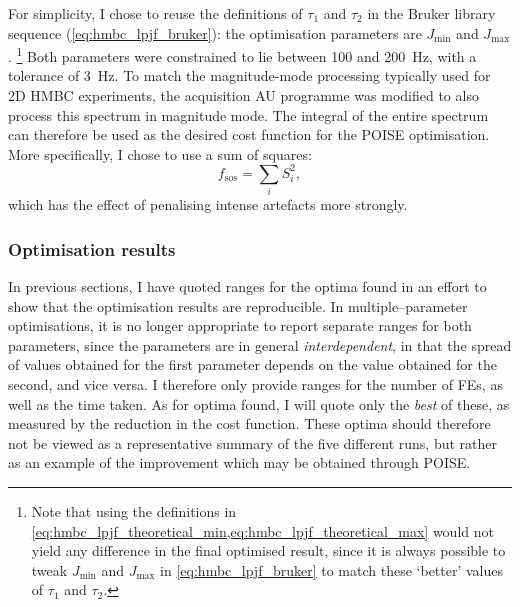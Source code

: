For simplicity, I chose to reuse the definitions of $\tau_1$ and $\tau_2$ in the Bruker library sequence (\cref{eq:hmbc_lpjf_bruker}): the optimisation parameters are $J_\text{min}$ and $J_\text{max}$.%
\footnote{Note that using the definitions in \cref{eq:hmbc_lpjf_theoretical_min,eq:hmbc_lpjf_theoretical_max} would not yield any difference in the final optimised result, since it is always possible to tweak $J_\text{min}$ and $J_\text{max}$ in \cref{eq:hmbc_lpjf_bruker} to match these `better' values of $\tau_1$ and $\tau_2$.}
Both parameters were constrained to lie between 100 and \SI{200}{\Hz}, with a tolerance of \SI{3}{\Hz}.
To match the magnitude-mode processing typically used for 2D HMBC experiments, the acquisition AU programme was modified to also process this spectrum in magnitude mode.
The integral of the entire spectrum can therefore be used as the desired cost function for the POISE optimisation.
More specifically, I chose to use a sum of squares:
\begin{equation}
    \label{eq:sos_cost_function}
    f_\text{sos} = \sum_i S_i^2,
\end{equation}
which has the effect of penalising intense artefacts more strongly.


\subsubsection{Optimisation results}

In previous sections, I have quoted ranges for the optima found in an effort to show that the optimisation results are reproducible.
In multiple--parameter optimisations, it is no longer appropriate to report separate ranges for both parameters, since the parameters are in general \textit{interdependent}, in that the spread of values obtained for the first parameter depends on the value obtained for the second, and vice versa.
I therefore only provide ranges for the number of FEs, as well as the time taken.
As for optima found, I will quote only the \textit{best} of these, as measured by the reduction in the cost function.
These optima should therefore not be viewed as a representative summary of the five different runs, but rather as an example of the improvement which may be obtained through POISE.

